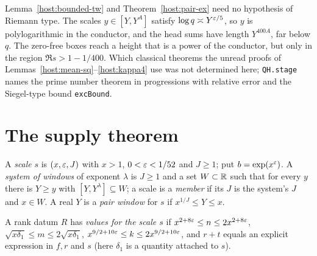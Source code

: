 \begin{remark}\label{host:rem-averaging}
Lemma~\ref{host:bounded-tw} and Theorem~\ref{host:pair-ex} need no
hypothesis of Riemann type. The scales $y\in[Y,Y^A]$ satisfy $\log q\asymp
Y^{\varepsilon/5}$, so $y$ is polylogarithmic in the conductor, and the head sums
have length $Y^{400A}$, far below $q$. The zero-free boxes reach a height
that is a power of the conductor, but only in the region
$\Re s>1-1/400$. Which classical theorems the unread proofs of
Lemmas~\ref{host:mean-sq}--\ref{host:kappa4} use was not determined here;
\texttt{QH.stage} names the prime number theorem in progressions with
relative error and the Siegel-type bound \texttt{excBound}.
\end{remark}

\section{The supply theorem}

\begin{definition}\label{host:scale}
A \emph{scale} $s$ is $(x,\varepsilon,J)$ with $x>1$, $0<\varepsilon<1/52$ and $J\ge1$;
put $b=\exp(x^{\varepsilon})$. A \emph{system of windows} of exponent $\lambda$ is
$J\ge1$ and a set $W\subset\mathbb{R}$ such that for every $y$ there is $Y\ge y$
with $[Y,Y^{\lambda}]\subseteq W$; a scale is a \emph{member} if its $J$ is
the system's $J$ and $x\in W$. A real $Y$ is a \emph{pair window} for $s$ if
$x^{1/J}\le Y\le x$.
\end{definition}

\begin{definition}\label{host:rank-val}
A rank datum $R$ has \emph{values for the scale $s$} if
$x^{2+8\varepsilon}\le n\le2x^{2+8\varepsilon}$, $\sqrt{x\delta_1}\le m\le2\sqrt{x\delta_1}$,
$x^{9/2+10\varepsilon}\le k\le2x^{9/2+10\varepsilon}$, and $r+t$ equals an explicit
expression in $f,r$ and $s$ (here $\delta_1$ is a quantity attached to $s$).
\end{definition}

